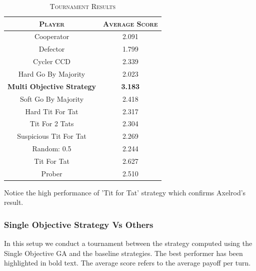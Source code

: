 \documentclass[a4paper]{article}
\begin{document}
	\begin{table}[H]
	  \begin{center}
	    \begin{tabular}{c|c}
	      \toprule
	      \textsc{Player} & \textsc{Average Score}\\
	      \midrule
			Cooperator & 2.091\\
			Defector & 1.799\\
			Cycler CCD & 2.339\\
			Hard Go By Majority & 2.023\\
			\textbf{Multi Objective Strategy} & \textbf{3.183}\\
			Soft Go By Majority & 2.418\\
			Hard Tit For Tat & 2.317\\
			Tit For 2 Tats & 2.304\\
			Suspicious Tit For Tat & 2.269\\
			Random: 0.5 & 2.244\\
			Tit For Tat & 2.627\\
			Prober & 2.510\\
		  \bottomrule
	    \end{tabular}
	    \caption{\textsc{Tournament Results}}
	  \end{center}
	\end{table}  

	Notice the high performance of 'Tit for Tat' strategy which confirms Axelrod's result.

	\subsubsection{Single Objective Strategy Vs Others}

In this setup we conduct a tournament between the strategy computed using the Single Objective GA and the baseline strategies. The best performer has been highlighted in bold text. The average score refers to the average payoff per turn.
	
\end{document}
